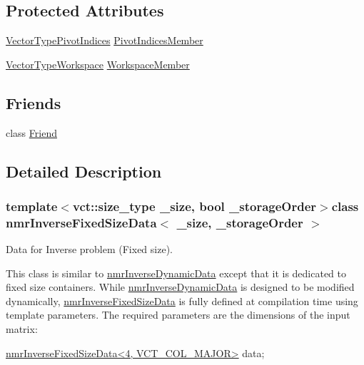 \subsection*{Protected Attributes}
\begin{DoxyCompactItemize}
\item 
\hyperlink{classnmr_inverse_fixed_size_data_ac8e0c496927d3fe726116c4c6ddf5af2}{Vector\-Type\-Pivot\-Indices} \hyperlink{classnmr_inverse_fixed_size_data_aab37fa3e8096dc8ec9ac1b9098c34769}{Pivot\-Indices\-Member}
\item 
\hyperlink{classnmr_inverse_fixed_size_data_ac3e08c421f20d9f34917b2cdc03f3b34}{Vector\-Type\-Workspace} \hyperlink{classnmr_inverse_fixed_size_data_a701268b213e63dd44ad0a9869fc20e15}{Workspace\-Member}
\end{DoxyCompactItemize}
\subsection*{Friends}
\begin{DoxyCompactItemize}
\item 
class \hyperlink{classnmr_inverse_fixed_size_data_a7f8321d57e81bc613d5dbef3410ba70e}{Friend}
\end{DoxyCompactItemize}


\subsection{Detailed Description}
\subsubsection*{template$<$vct\-::size\-\_\-type \-\_\-size, bool \-\_\-storage\-Order$>$class nmr\-Inverse\-Fixed\-Size\-Data$<$ \-\_\-size, \-\_\-storage\-Order $>$}

Data for Inverse problem (Fixed size). 

This class is similar to \hyperlink{classnmr_inverse_dynamic_data}{nmr\-Inverse\-Dynamic\-Data} except that it is dedicated to fixed size containers. While \hyperlink{classnmr_inverse_dynamic_data}{nmr\-Inverse\-Dynamic\-Data} is designed to be modified dynamically, \hyperlink{classnmr_inverse_fixed_size_data}{nmr\-Inverse\-Fixed\-Size\-Data} is fully defined at compilation time using template parameters. The required parameters are the dimensions of the input matrix\-: 
\begin{DoxyCode}
\hyperlink{classnmr_inverse_fixed_size_data}{nmrInverseFixedSizeData<4, VCT\_COL\_MAJOR>} data;
\end{DoxyCode}


